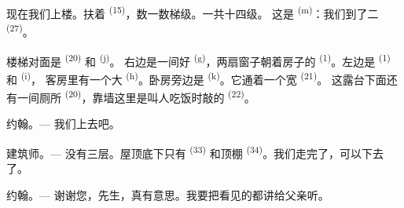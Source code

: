 现在我们上楼。扶着 \textsuperscript{(15)}，数一数梯级。一共十四级。
这是 \textsuperscript{(m)}：我们到了二
\textsuperscript{(27)}。

\VUsaut{3.0mm}
\VUsaut{3.0mm}

楼梯对面是 \textsuperscript{(20)} 和 \textsuperscript{(j)}。
右边是一间好 \textsuperscript{(g)}，两扇窗子朝着房子的
\textsuperscript{(1)}。左边是 \textsuperscript{(1)} 和 \textsuperscript{(i)}，
客房里有一个大 \textsuperscript{(h)}。卧房旁边是
 \textsuperscript{(k)}。它通着一个宽 \textsuperscript{(21)}。
这露台下面还有一间厕所 \textsuperscript{(20)}，靠墙这里是叫人吃饭时敲的
 \textsuperscript{(22)}。

\textsc{约翰}。--- 我们上去吧。

\textsc{建筑师}。--- 没有三层。屋顶底下只有 \textsuperscript{(33)}
和顶棚 \textsuperscript{(34)}。我们走完了，可以下去了。

\textsc{约翰}。--- 谢谢您，先生，真有意思。我要把看见的都讲给父亲听。
\VUsaut{4.0mm}
\VUfilet{22mm}
